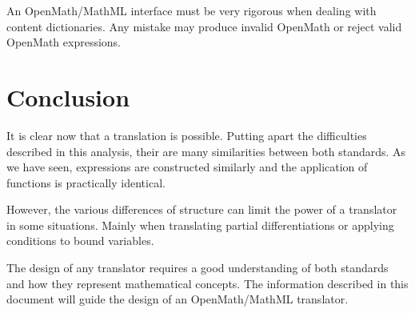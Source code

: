An OpenMath/MathML interface must be very rigorous when dealing with
content dictionaries. Any mistake may produce invalid OpenMath or
reject valid OpenMath expressions.

\section{Conclusion}

It is clear now that a translation is possible. Putting apart the
difficulties described in this analysis, their are many similarities
between both standards. As we have seen, expressions are constructed
similarly and the application of functions is practically identical.

However, the various differences of structure can limit the power of a
translator in some situations. Mainly when translating partial
differentiations or applying conditions to bound variables.

The design of any translator requires a good understanding of both
standards and how they represent mathematical concepts. The
information described in this document will guide the design of an
OpenMath/MathML translator.

